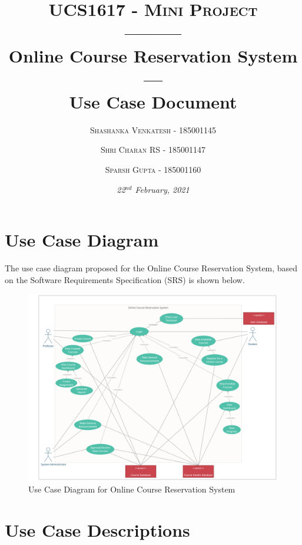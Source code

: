 \documentclass[12pt, a4]{article}
\title{{\large \textsc{UCS1617 - Mini Project}}\\---------\\\textbf{\huge{Online Course Reservation System}}\\---\\\textbf{Use Case Document}}
\author {
  \textsc{Shashanka Venkatesh - 185001145}
  \and
  \textsc{Shri Charan RS - 185001147}
  \and
  \textsc{Sparsh Gupta - 185001160}
}
\date{\normalsize{\textsl{22$^{nd}$ February, 2021}}}
\begin{document}
\maketitle
\newpage
\tableofcontents


\newpage
\section{Use Case Diagram}
The use case diagram proposed for the Online Course Reservation System, based on the Software Requirements Specification (SRS) is shown below.
\begin{figure}[h]
    \centering
    \includegraphics[width=\textwidth]{Use Case Diagram.png}
    \caption{Use Case Diagram for Online Course Reservation System}
\end{figure}


\newpage
\section{Use Case Descriptions}

\end{document}

